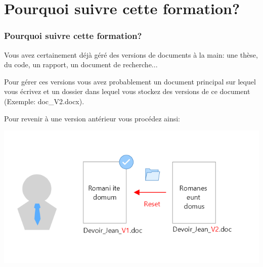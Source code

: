 \documentclass{beamer}
\begin{document}
\section{Pourquoi suivre cette formation?}
\begin{frame}
\frametitle{Pourquoi suivre cette formation?}
Vous avez certainement déjà géré des versions de documents à la main: une thèse, du code, un rapport, un document de recherche... \\
\medskip

Pour gérer ces versions vous avez probablement un document principal sur lequel vous écrivez et un dossier dans lequel vous stockez des versions de ce document (Exemple: doc\_V2.docx).\\
\medskip

Pour revenir à une version antérieur vous procédez ainsi:
\begin{center}
\includegraphics[scale=0.28]{images/pourquoi/firstScenario_diapo4.png}
\end{center}
\end{frame}
\end{document}
